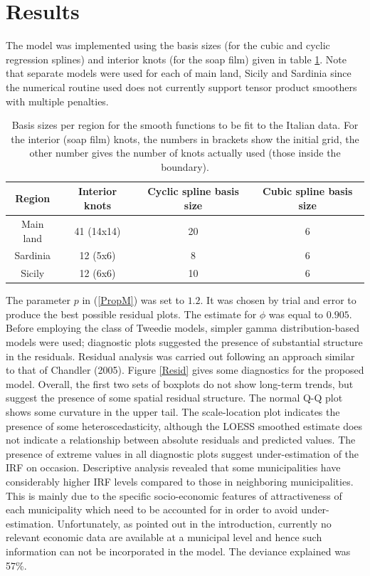 \section{Results \label{ER}}

The model was implemented using the basis sizes (for the cubic and cyclic regression splines) and interior knots (for the soap film) given in table \ref{soap-basis-table}. Note that separate models were used for each of main land, Sicily and Sardinia since the numerical routine used does not currently support tensor product smoothers with multiple penalties. 

\begin{table}[t]
\centering
\begin{tabular}{c c c c}\\
Region & Interior knots & Cyclic spline basis size & Cubic spline basis size\\
\hline
Main land & 41 (14x14) & 20 & 6\\
Sardinia & 12 (5x6) & 8 & 6\\
Sicily & 12 (6x6) & 10 & 6\\
\end{tabular}
\caption{Basis sizes per region for the smooth functions to be fit to the Italian data. For the interior (soap film) knots, the numbers in brackets show the initial grid, the other number gives the number of knots actually used (those inside the boundary).}
\label{soap-basis-table}
\end{table}

The parameter $p$ in (\ref{PropM}) was set to $1.2$. It was chosen by trial and error to produce the best possible residual plots. The estimate for $\phi$ was equal to $0.905$. Before employing the class of Tweedie models, simpler gamma distribution-based models were used; diagnostic plots suggested the presence of substantial structure in the residuals. Residual analysis was carried out following an approach similar to that of Chandler (2005). Figure \ref{Resid} gives some diagnostics for the proposed model. Overall, the first two sets of boxplots do not show long-term trends, but suggest the presence of some spatial residual structure. The normal Q-Q plot shows some curvature in the upper tail. The scale-location plot indicates the presence of some heteroscedasticity, although the LOESS smoothed estimate does not indicate a relationship between absolute residuals and predicted values. The presence of extreme values in all diagnostic plots suggest under-estimation of the IRF on occasion. Descriptive analysis revealed that some municipalities have considerably higher IRF levels compared to those in neighboring municipalities. This is mainly due to the specific socio-economic features of attractiveness of each municipality which need to be accounted for in order to avoid under-estimation. Unfortunately, as pointed out in the introduction, currently no relevant economic data are available at a municipal level and hence such information can not be incorporated in the model. The deviance explained was 57\%. 

